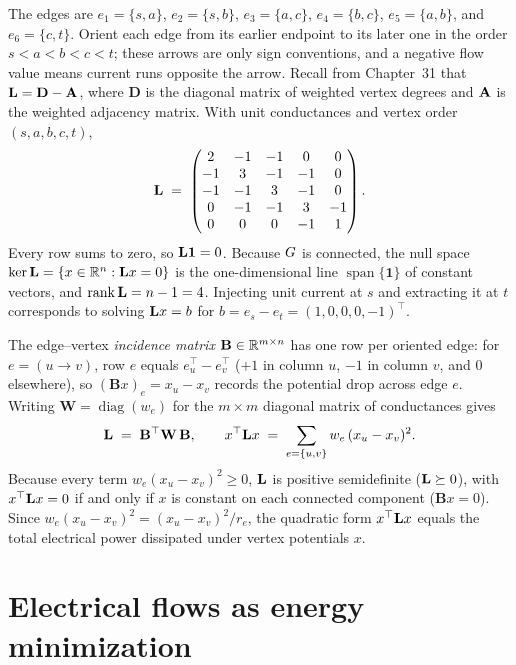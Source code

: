 The edges are $e_1=\{s,a\}$, $e_2=\{s,b\}$, $e_3=\{a,c\}$, $e_4=\{b,c\}$, $e_5=\{a,b\}$, and $e_6=\{c,t\}$. Orient each edge from its earlier endpoint to its later one in the order $s<a<b<c<t$; these arrows are only sign conventions, and a negative flow value means current runs opposite the arrow. Recall from Chapter~31 that $\mathbf{L} = \mathbf{D} - \mathbf{A}$, where $\mathbf{D}$ is the diagonal matrix of weighted vertex degrees and $\mathbf{A}$ is the weighted adjacency matrix. With unit conductances and vertex order $(s,a,b,c,t)$,
\[
  \mathbf{L} \;=\;
  \begin{pmatrix}
    2 & -1 & -1 & 0 & 0\\
    -1 & 3 & -1 & -1 & 0\\
    -1 & -1 & 3 & -1 & 0\\
    0 & -1 & -1 & 3 & -1\\
    0 & 0 & 0 & -1 & 1
  \end{pmatrix}.
\]
Every row sums to zero, so $\mathbf{L} \mathbf{1} = 0$. Because $G$ is connected, the null space $\ker \mathbf{L} = \{x \in \mathbb{R}^n : \mathbf{L} x = 0\}$ is the one-dimensional line $\operatorname{span}\{\mathbf{1}\}$ of constant vectors, and $\operatorname{rank} \mathbf{L} = n - 1 = 4$. Injecting unit current at $s$ and extracting it at $t$ corresponds to solving $\mathbf{L} x = b$ for $b = e_s - e_t = (1,0,0,0,-1)^\top$.

\begin{focusbox}
The edge--vertex \emph{incidence matrix} $\mathbf{B}\in\mathbb{R}^{m\times n}$ has one row per oriented edge: for $e=(u\to v)$, row $e$ equals $e_u^\top - e_v^\top$ ($+1$ in column $u$, $-1$ in column $v$, and $0$ elsewhere), so $(\mathbf{B}x)_e = x_u - x_v$ records the potential drop across edge $e$. Writing $\mathbf{W}=\operatorname{diag}(w_e)$ for the $m\times m$ diagonal matrix of conductances gives
\[
  \mathbf{L} \;=\; \mathbf{B}^\top \mathbf{W}\, \mathbf{B},
  \qquad
  x^\top \mathbf{L} x \;=\; \sum_{e=\{u,v\}} w_e\,(x_u - x_v)^2 .
\]
Because every term $w_e(x_u - x_v)^2 \ge 0$, $\mathbf{L}$ is positive semidefinite ($\mathbf{L} \succeq 0$), with $x^\top \mathbf{L} x = 0$ if and only if $x$ is constant on each connected component ($\mathbf{B}x = 0$). Since $w_e(x_u - x_v)^2 = (x_u - x_v)^2 / r_e$, the quadratic form $x^\top \mathbf{L} x$ equals the total electrical power dissipated under vertex potentials $x$.
\end{focusbox}

\section{Electrical flows as energy minimization}\label{ch41:elec}

